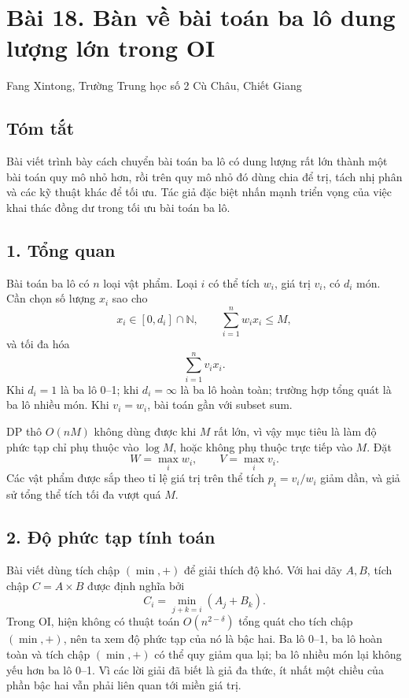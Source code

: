 \documentclass[11pt]{article}
\begin{document}
\section*{Bài 18. Bàn về bài toán ba lô dung lượng lớn trong OI}

\begin{center}
Fang Xintong, Trường Trung học số 2 Cù Châu, Chiết Giang
\end{center}

\subsection*{Tóm tắt}

Bài viết trình bày cách chuyển bài toán ba lô có dung lượng rất lớn thành một
bài toán quy mô nhỏ hơn, rồi trên quy mô nhỏ đó dùng chia để trị, tách nhị
phân và các kỹ thuật khác để tối ưu. Tác giả đặc biệt nhấn mạnh triển vọng của
việc khai thác đồng dư trong tối ưu bài toán ba lô.

\subsection*{1. Tổng quan}

Bài toán ba lô có \(n\) loại vật phẩm. Loại \(i\) có thể tích \(w_i\), giá trị
\(v_i\), có \(d_i\) món. Cần chọn số lượng \(x_i\) sao cho
\[
  x_i\in[0,d_i]\cap\mathbb{N},\qquad
  \sum_{i=1}^{n} w_i x_i\le M,
\]
và tối đa hóa
\[
  \sum_{i=1}^{n} v_i x_i.
\]
Khi \(d_i=1\) là ba lô 0--1; khi \(d_i=\infty\) là ba lô hoàn toàn; trường hợp
tổng quát là ba lô nhiều món. Khi \(v_i=w_i\), bài toán gần với subset sum.

DP thô \(O(nM)\) không dùng được khi \(M\) rất lớn, vì vậy mục tiêu là làm độ
phức tạp chỉ phụ thuộc vào \(\log M\), hoặc không phụ thuộc trực tiếp vào
\(M\). Đặt
\[
  W=\max_i w_i,\qquad V=\max_i v_i.
\]
Các vật phẩm được sắp theo tỉ lệ giá trị trên thể tích \(p_i=v_i/w_i\) giảm
dần, và giả sử tổng thể tích tối đa vượt quá \(M\).

\subsection*{2. Độ phức tạp tính toán}

Bài viết dùng tích chập \((\min,+)\) để giải thích độ khó. Với hai dãy \(A,B\),
tích chập \(C=A\times B\) được định nghĩa bởi
\[
  C_i=\min_{j+k=i}(A_j+B_k).
\]
Trong OI, hiện không có thuật toán \(O(n^{2-\delta})\) tổng quát cho tích chập
\((\min,+)\), nên ta xem độ phức tạp của nó là bậc hai. Ba lô 0--1, ba lô hoàn
toàn và tích chập \((\min,+)\) có thể quy giảm qua lại; ba lô nhiều món lại
không yếu hơn ba lô 0--1. Vì các lời giải đã biết là giả đa thức, ít nhất một
chiều của phần bậc hai vẫn phải liên quan tới miền giá trị.
\end{document}

